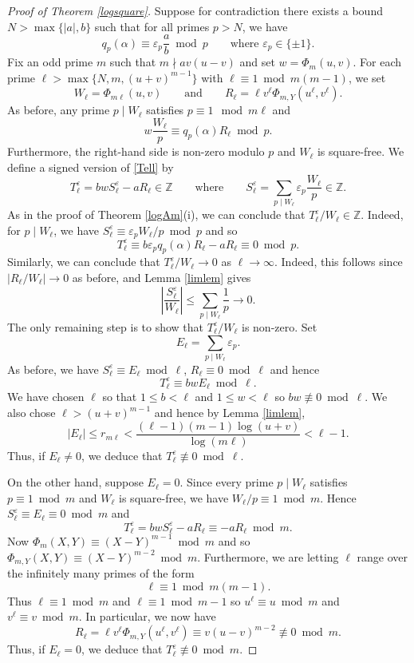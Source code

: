 \documentclass[12pt,reqno]{amsart}
\theoremstyle{remark}
\begin{document}
\begin{proof}[Proof of Theorem \ref{logsquare}] 
Suppose for contradiction there exists a bound $N>\max\{|a|,b\}$ such that for all primes $p>N$, we have
\[q_p(\alpha)\equiv\varepsilon_p\frac{a}{b}\bmod p \qquad\text{where $\varepsilon_p\in\{\pm 1\}$}.\] 
Fix an odd prime $m$ such that $m\nmid av(u-v)$ and set $w=\Phi_m(u,v)$.
For each prime $\ell>\max\{N,m,(u+v)^{m-1}\}$ with $\ell\equiv 1\bmod m(m-1)$, we set 
\[W_\ell=\Phi_{m\ell}(u,v)\qquad\text{and}\qquad R_\ell=\ell v^\ell\Phi_{m,Y}(u^\ell,v^\ell).\]
As before, any prime $p\mid W_\ell$ satisfies $p\equiv 1\mod m\ell$ and
\[w\frac{W_\ell}{p}\equiv q_p(\alpha)R_\ell\bmod p.\]
Furthermore, the right-hand side is non-zero modulo $p$ and $W_\ell$ is square-free. 
We define a signed version of \eqref{Tell} by 
\begin{equation*}
T_\ell^\varepsilon=bwS_\ell^\varepsilon-aR_\ell\in\mathbb{Z}\qquad\text{where}\qquad S_\ell^\varepsilon=\sum_{p\mid W_\ell}\varepsilon_p\frac{W_\ell}{p}\in\mathbb{Z}.
\end{equation*}
As in the proof of Theorem \ref{logAm}(i), we can conclude that $T_\ell^\varepsilon/W_\ell\in\mathbb{Z}$. 
Indeed, for $p\mid W_\ell$, we have $S_\ell^\varepsilon\equiv \varepsilon_pW_\ell/p\bmod p$ and so 
\[T_\ell^\varepsilon\equiv b\varepsilon_pq_p(\alpha)R_\ell-aR_\ell\equiv 0\bmod p.\]
Similarly, we can conclude that $T_\ell^\varepsilon/W_\ell\to 0$ as $\ell\to\infty$. 
Indeed, this follows since $\left|R_\ell/W_\ell\right|\to 0$ as before, and Lemma \ref{limlem} gives
\[\left|\frac{S_\ell^\varepsilon}{W_\ell}\right|\leq \sum_{p\mid W_\ell}\frac{1}{p}\longrightarrow 0.\]
The only remaining step is to show that $T_\ell^\varepsilon/W_\ell$ is non-zero. 
Set 
\[E_\ell=\sum_{p\mid W_\ell}\varepsilon_p.\]
As before, we have $S_\ell^\varepsilon\equiv E_\ell\bmod \ell$, $R_\ell\equiv 0\bmod \ell$ and hence 
\[T_\ell^\varepsilon\equiv bwE_\ell\bmod \ell.\]
We have chosen $\ell$ so that $1\leq b<\ell$ and $1\leq w<\ell$ so $bw\not\equiv 0\bmod\ell$. 
We also chose $\ell>(u+v)^{m-1}$ and hence by Lemma \ref{limlem},
\[\left|E_\ell\right|\leq r_{m\ell}<\frac{(\ell-1)(m-1)\log(u+v)}{\log(m\ell)}<\ell-1.\]
Thus, if $E_\ell\neq 0$, we deduce that $T_\ell^\varepsilon\not\equiv 0\bmod \ell$.
\medskip

On the other hand, suppose $E_\ell=0$. 
Since every prime $p\mid W_\ell$ satisfies $p\equiv 1 \bmod m$ and $W_\ell$ is square-free, we have $W_\ell/p\equiv 1\bmod m$. Hence $S_\ell^\varepsilon\equiv E_\ell\equiv 0\bmod m$ and
\[T_\ell^\varepsilon=bwS_\ell^\varepsilon-aR_\ell\equiv -aR_\ell\bmod m.\]
Now $\Phi_m(X,Y)\equiv (X-Y)^{m-1}\bmod m$ and so $\Phi_{m,Y}(X,Y)\equiv (X-Y)^{m-2}\bmod m$. 
Furthermore, we are letting $\ell$ range over the infinitely many primes of the form
\[\ell\equiv 1\bmod m(m-1).\] 
Thus $\ell\equiv 1\bmod m$ and $\ell\equiv 1\bmod m-1$ so $u^\ell\equiv u\bmod m$ and $v^\ell\equiv v\bmod m$. 
In particular, we now have
\[R_\ell=\ell v^\ell\Phi_{m,Y}(u^\ell,v^\ell)\equiv v(u-v)^{m-2}\not\equiv 0\bmod m.\]
Thus, if $E_\ell=0$, we deduce that $T_\ell^\varepsilon\not\equiv 0\bmod m$.
\medskip


\end{proof}
\end{document}
